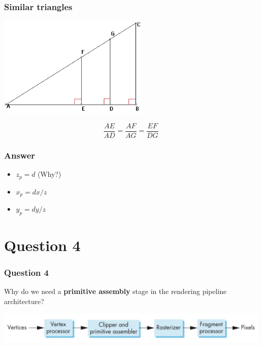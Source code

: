 \documentclass{beamer}
\begin{document}
\begin{frame}
    \frametitle{Similar triangles}

    {\centering
        \includegraphics[scale=0.8]{similar-tris.png}
    }

    $$
    \frac{AE}{AD} = \frac{AF}{AG} = \frac{EF}{DG}
    $$

\end{frame}

\begin{frame}
    \frametitle{Answer}

    \begin{itemize}
        \item $z_p = d$ (Why?)
        \item $x_p = dx/z$
        \item $y_p = dy/z$
    \end{itemize}

\end{frame}

\section{Question 4}

\begin{frame}
    \frametitle{Question 4}
    Why do we need a \textbf{primitive assembly} stage in the rendering pipeline architecture?

    \vspace{1em}

    {\centering \includegraphics[scale=0.4]{simple-pipeline.png}}
\end{frame}
\end{document}

